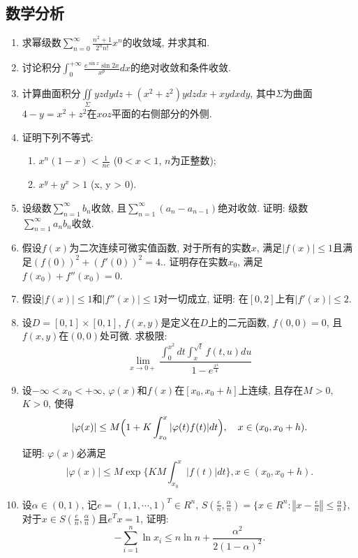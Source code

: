 \documentclass[12pt,a4paper,openany]{book}
\newcommand\num[1]{\left\Vert{#1}\right\Vert}
\begin{document}
\subsection{数学分析}
\begin{enumerate}
\item 求幂级数$\sum\limits_{n=0}^{\infty}{\displaystyle\frac{n^2 + 1}{2^nn!}x^n}$的收敛域, 并求其和.

\item 讨论积分$\displaystyle\int_{0}^{+\infty}{\frac{e^{\sin{x}}\sin{2x}}{x^p}dx}$的绝对收敛和条件收敛.

\item 计算曲面积分$\displaystyle\iint\limits_{\varSigma}{yzdydz + (x^2 + z^2)ydzdx + xydxdy}$, 其中$\varSigma$为曲面$4 - y = x^2 + z^2$在$xoz$平面的右侧部分的外侧.

\item 证明下列不等式:
\begin{enumerate}
\item $x^n(1 - x) < \displaystyle\frac{1}{ne}$ \quad ($0 < x < 1$, $n$为正整数);
\item $x^y + y^x > 1$ \quad (x, y > 0).
\end{enumerate}

\item 设级数$\sum\limits_{n=1}^{\infty}{b_n}$收敛, 且$\sum\limits_{n=1}^{\infty}{(a_n - a_{n-1})}$绝对收敛. 证明: 级数$\sum\limits_{n=1}^{\infty}{a_nb_n}$收敛.

\item 假设$f(x)$为二次连续可微实值函数, 对于所有的实数$x$, 满足$|f(x)| \le 1$且满足$(f(0))^2 + (f'(0))^2 = 4$.. 证明存在实数$x_0$, 满足$f(x_0) + f''(x_0) = 0$.

\item 假设$|f(x)| \le 1$和$|f''(x)| \le 1$对一切成立, 证明: 在$[0, 2]$上有$|f'(x)| \le 2$.

\item 设$D = [0, 1] \times [0, 1]$, $f(x, y)$是定义在$D$上的二元函数, $f(0, 0) = 0$, 且$f(x, y)$在$(0, 0)$处可微. 求极限:
\[
\lim_{x \rightarrow 0+}{\frac{\displaystyle\int_{0}^{x^2}{dt}\int_{x}^{\sqrt{t}}{f(t, u)du}}{1 - e^{\frac{x^4}{4}}}}
\]

\item 设$-\infty < x_0 < +\infty$, $\varphi(x)$和$f(x)$在$[x_0, x_0 + h]$上连续, 且存在$M > 0$, $K > 0$, 使得
\[
|\varphi(x)| \le M \Bigl{(} 1 + K\int_{x_0}^{x}{|\varphi(t)f(t)|dt}  \Bigr{)}, \quad x \in (x_0, x_0 + h).
\]
证明: $\varphi(x)$必满足
\[
|\varphi(x)| \le M\exp{\{ KM\int_{x_0}^{x}{|f(t)|dt} \}}, x \in (x_0, x_0 + h).
\]

\item 设$\alpha \in (0, 1)$, 记$e = (1, 1, \cdots, 1)^T \in R^n$, $S(\displaystyle\frac{e}{n}, \frac{\alpha}{n}) = \{ x \in R^n : \num{x - \frac{e}{n}} \le \frac{\alpha}{n} \}$, 对于$x \in S(\displaystyle\frac{e}{n}, \frac{\alpha}{n})$且$e^Tx = 1$, 证明:
\[
-\sum_{i=1}^{n}{\ln{x_i}} \le n\ln{n} + \frac{\alpha^2}{2(1 - \alpha)^2}.
\]

\end{enumerate}
\end{document}
